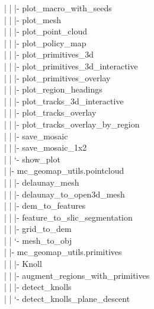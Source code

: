 \documentclass[11pt]{article}
\begin{document}
\textcolor{TreeLevelThree}{|  |  |- plot\_macro\_with\_seeds}\\
\textcolor{TreeLevelThree}{|  |  |- plot\_mesh}\\
\textcolor{TreeLevelThree}{|  |  |- plot\_point\_cloud}\\
\textcolor{TreeLevelThree}{|  |  |- plot\_policy\_map}\\
\textcolor{TreeLevelThree}{|  |  |- plot\_primitives\_3d}\\
\textcolor{TreeLevelThree}{|  |  |- plot\_primitives\_3d\_interactive}\\
\textcolor{TreeLevelThree}{|  |  |- plot\_primitives\_overlay}\\
\textcolor{TreeLevelThree}{|  |  |- plot\_region\_headings}\\
\textcolor{TreeLevelThree}{|  |  |- plot\_tracks\_3d\_interactive}\\
\textcolor{TreeLevelThree}{|  |  |- plot\_tracks\_overlay}\\
\textcolor{TreeLevelThree}{|  |  |- plot\_tracks\_overlay\_by\_region}\\
\textcolor{TreeLevelThree}{|  |  |- save\_mosaic}\\
\textcolor{TreeLevelThree}{|  |  |- save\_mosaic\_1x2}\\
\textcolor{TreeLevelThree}{|  |  `- show\_plot}\\
\textcolor{TreeLevelTwo}{|  |- mc\_geomap\_utils.pointcloud}\\
\textcolor{TreeLevelThree}{|  |  |- delaunay\_mesh}\\
\textcolor{TreeLevelThree}{|  |  |- delaunay\_to\_open3d\_mesh}\\
\textcolor{TreeLevelThree}{|  |  |- dem\_to\_features}\\
\textcolor{TreeLevelThree}{|  |  |- feature\_to\_slic\_segmentation}\\
\textcolor{TreeLevelThree}{|  |  |- grid\_to\_dem}\\
\textcolor{TreeLevelThree}{|  |  `- mesh\_to\_obj}\\
\textcolor{TreeLevelTwo}{|  |- mc\_geomap\_utils.primitives}\\
\textcolor{TreeLevelThree}{|  |  |- Knoll}\\
\textcolor{TreeLevelThree}{|  |  |- augment\_regions\_with\_primitives}\\
\textcolor{TreeLevelThree}{|  |  |- detect\_knolls}\\
\textcolor{TreeLevelThree}{|  |  `- detect\_knolls\_plane\_descent}\\
\end{document}
